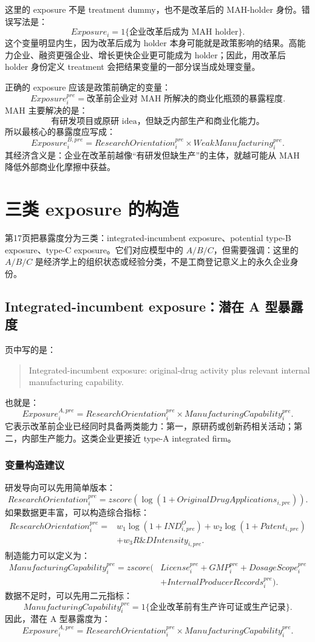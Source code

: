 \documentclass[12pt]{ctexart}
\begin{document}
这里的 exposure 不是 treatment dummy，也不是改革后的 MAH-holder 身份。错误写法是：
\[
Exposure_i=1\{\text{企业改革后成为 MAH holder}\}.
\]
这个变量明显内生，因为改革后成为 holder 本身可能就是政策影响的结果。高能力企业、融资更强企业、增长更快企业更可能成为 holder；因此，用改革后 holder 身份定义 treatment 会把结果变量的一部分误当成处理变量。

正确的 exposure 应该是政策前确定的变量：
\[
Exposure_i^{pre}=\text{改革前企业对 MAH 所解决的商业化瓶颈的暴露程度}.
\]
MAH 主要解决的是：
\[
\text{有研发项目或原研 idea，但缺乏内部生产和商业化能力。}
\]
所以最核心的暴露度应写成：
\[
\boxed{
Exposure_i^{B,pre}=ResearchOrientation_i^{pre}\times WeakManufacturing_i^{pre}.
}
\]
其经济含义是：企业在改革前越像“有研发但缺生产”的主体，就越可能从 MAH 降低外部商业化摩擦中获益。

\section{三类 exposure 的构造}

第17页把暴露度分为三类：integrated-incumbent exposure、potential type-B exposure、type-C exposure。它们对应模型中的 $A/B/C$，但需要强调：这里的 $A/B/C$ 是经济学上的组织状态或经验分类，不是工商登记意义上的永久企业身份。

\subsection{Integrated-incumbent exposure：潜在 A 型暴露度}

页中写的是：
\begin{quote}
Integrated-incumbent exposure: original-drug activity plus relevant internal manufacturing capability.
\end{quote}
也就是：
\[
Exposure_i^{A,pre}=ResearchOrientation_i^{pre}\times ManufacturingCapability_i^{pre}.
\]
它表示改革前企业已经同时具备两类能力：第一，原研药或创新药相关活动；第二，内部生产能力。这类企业更接近 type-A integrated firm。

\subsubsection*{变量构造建议}

研发导向可以先用简单版本：
\[
ResearchOrientation_i^{pre}=zscore\left(\log(1+OriginalDrugApplications_{i,pre})\right).
\]
如果数据更丰富，可以构造综合指标：
\[
\begin{aligned}
ResearchOrientation_i^{pre}={}&w_1\log(1+IND_{i,pre}^{O})+w_2\log(1+Patent_{i,pre})\\
&+w_3R\&DIntensity_{i,pre}.
\end{aligned}
\]
制造能力可以定义为：
\[
\begin{aligned}
ManufacturingCapability_i^{pre}=zscore\big(&License_i^{pre}+GMP_i^{pre}+DosageScope_i^{pre}\\
&+InternalProducerRecords_i^{pre}\big).
\end{aligned}
\]
数据不足时，可以先用二元指标：
\[
ManufacturingCapability_i^{pre}=1\{\text{企业改革前有生产许可证或生产记录}\}.
\]
因此，潜在 A 型暴露度为：
\[
Exposure_i^{A,pre}=ResearchOrientation_i^{pre}\times ManufacturingCapability_i^{pre}.
\]
\end{document}

